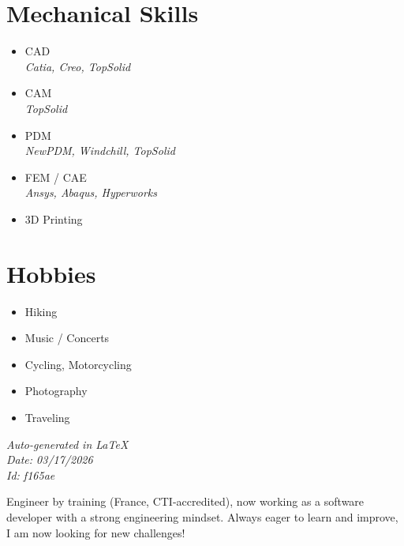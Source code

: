 \documentclass[]{friggeri-cv}
\begin{document}
\begin{aside}
\section{Mechanical Skills}
\begin{itemize}
\item CAD
 \\ \hspace*{0.2em}\small\textit{Catia, Creo, TopSolid}
\item CAM
 \\ \hspace*{0.2em}\small\textit{TopSolid}
\item PDM
 \\ \hspace*{0.2em}\small\textit{NewPDM, Windchill, TopSolid}
\item FEM / CAE
 \\ \hspace*{0.2em}\small\textit{Ansys, Abaqus, Hyperworks}
\item 3D Printing
\end{itemize}
\section{Hobbies}
\begin{itemize}
\item Hiking
\item Music / Concerts
\item Cycling, Motorcycling
\item Photography
\item Traveling
\end{itemize}
\vspace{2.5mm}%
\small \emph{Auto-generated in \LaTeX}\\
\small \emph{Date: 03/17/2026} \hspace*{8mm}\\
\small \emph{Id: f165ae} %

\end{aside}

\vspace*{-2.0mm}
\noindent\parbox{\linewidth}{
  \centering
  Engineer by training (France, CTI-accredited), now working as a software developer with a strong engineering mindset. Always eager to learn and improve, I am now looking for new challenges!
}
\vspace*{0.8mm}
\end{document}
